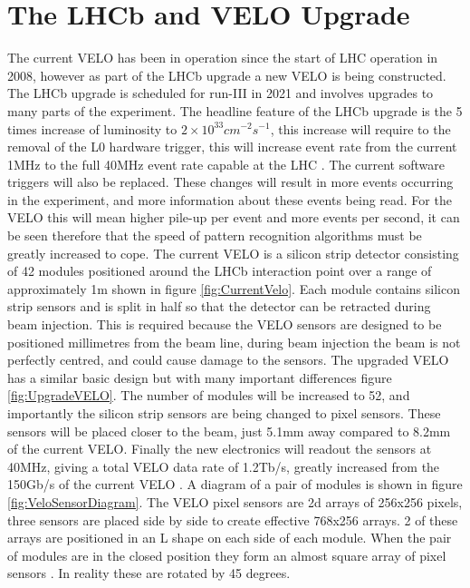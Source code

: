 
\section{The LHCb and VELO Upgrade}  %

The current VELO has been in operation since the start of LHC operation in 2008, however as part of the LHCb upgrade a new VELO is being constructed. The LHCb upgrade is scheduled for run-III in 2021 \cite{Hennessy2016LHCbUpgrade} and involves upgrades to many parts of the experiment. 
The headline feature of the LHCb upgrade is the 5 times increase of luminosity to \(2\times10^{33} cm^{-2} s^{-1}\), this increase will require to the removal of the L0 hardware trigger, this will increase event rate from the current 1MHz to the full 40MHz event rate capable at the LHC \cite{Collaboration:1624070}. The current software triggers will also be replaced. These changes will result in more events occurring in the experiment, and more information about these events being read. For the VELO this will mean higher pile-up per event and more events per second, it can be seen therefore that the speed of pattern recognition algorithms must be greatly increased to cope.
The current VELO is a silicon strip detector consisting of 42 modules positioned around the LHCb interaction point over a range of approximately 1m shown in figure \ref{fig:CurrentVelo}. Each module contains silicon strip sensors and is split in half so that the detector can be retracted during beam injection. This is required because the VELO sensors are designed to be positioned millimetres from the beam line, during beam injection the beam is not perfectly centred, and could cause damage to the sensors. 
The upgraded VELO has a similar basic design but with many important differences figure \ref{fig:UpgradeVELO}. The number of modules will be increased to 52, and importantly the silicon strip sensors are being changed to pixel sensors. These sensors will be placed closer to the beam, just 5.1mm away compared to 8.2mm of the current VELO. Finally the new electronics will readout the sensors at 40MHz, giving a total VELO data rate of 1.2Tb/s, greatly increased from the 150Gb/s of the current VELO \cite{Hennessy2016LHCbUpgrade}. 
A diagram of a pair of modules is shown in figure \ref{fig:VeloSensorDiagram}. The VELO pixel sensors are 2d arrays of 256x256 pixels, three sensors are placed side by side to create effective 768x256 arrays. 2 of these arrays are positioned in an L shape on each side of each module. When the pair of modules are in the closed position they form an almost square array of pixel sensors \cite{Bird:1620453}. In reality these are rotated by 45 degrees.

